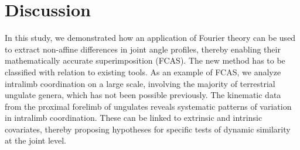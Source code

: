 \FloatBarrier\pagebreak
\section{Discussion}
In this study, we demonstrated how an application of Fourier theory can be used to extract non-affine differences in joint angle profiles, thereby enabling their mathematically accurate superimposition (FCAS).
The new method has to be classified with relation to existing tools.
As an example of FCAS, we analyze intralimb coordination on a large scale, involving the majority of terrestrial ungulate genera, which has not been possible previously.
The kinematic data from the proximal forelimb of ungulates reveals systematic patterns of variation in intralimb coordination.
These can be linked to extrinsic and intrinsic covariates, thereby proposing hypotheses for specific tests of dynamic similarity at the joint level.



